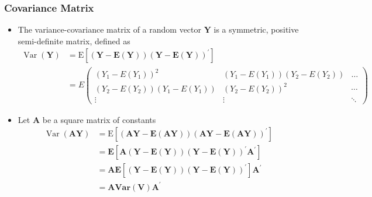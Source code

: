 \documentclass[10pt]{article}
\begin{document}
\subsubsection{Covariance Matrix}
\begin{itemize}
    \item The variance-covariance matrix of a random vector $\mathbf{Y}$ is a symmetric, positive semi-definite matrix, defined as
    \begin{align*}
        \operatorname{Var}(\mathbf{Y}) 
        &= \mathrm{E}\left[(\mathbf{Y}-\mathbf{E}(\mathbf{Y}))(\mathbf{Y}-\mathbf{E}(\mathbf{Y}))^{\prime}\right] \\
        &= E\left(
            \begin{array}{ccc}
                {\left(Y_{1}-E\left(Y_{1}\right)\right)^{2}} & {\left(Y_{1}-E\left(Y_{1}\right)\right)\left(Y_{2}-E\left(Y_{2}\right)\right)} & {\ldots} \\ {\left(Y_{2}-E\left(Y_{2}\right)\right)\left(Y_{1}-E\left(Y_{1}\right)\right)} & {\left(Y_{2}-E\left(Y_{2}\right)\right)^{2}} & {\cdots} \\ {\vdots} & {\vdots} & {\ddots}
            \end{array}
        \right)
    \end{align*}
    \item Let $\mathbf{A}$ be a square matrix of constants
        \begin{align*}
            \operatorname{Var}(\mathbf{A Y}) 
            &=\mathrm{E}\left[(\mathbf{A} \mathbf{Y}-\mathbf{E}(\mathbf{A} \mathbf{Y}))(\mathbf{A} \mathbf{Y}-\mathbf{E}(\mathbf{A} \mathbf{Y}))^{\prime}\right] \\ 
            &=\mathbf{E}\left[\mathbf{A}(\mathbf{Y}-\mathbf{E}(\mathbf{Y}))(\mathbf{Y}-\mathbf{E}(\mathbf{Y}))^{\prime} \mathbf{A}^{\prime}\right] \\ 
            &=\mathbf{A} \mathbf{E}\left[(\mathbf{Y}-\mathbf{E}(\mathbf{Y}))(\mathbf{Y}-\mathbf{E}(\mathbf{Y}))^{\prime}\right] \mathbf{A}^{\prime} \\ 
            &=\mathbf{A} \mathbf{V} \mathbf{a r}(\mathbf{V}) \mathbf{A}^{\prime}
        \end{align*}
\end{itemize}
\end{document}
